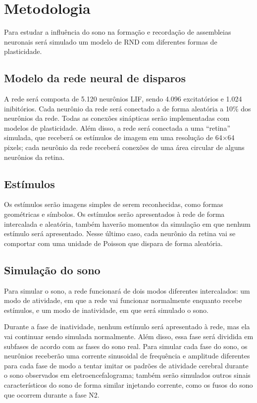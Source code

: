 \chapter{Metodologia}

Para estudar a influência do sono na formação e recordação de assembleias neuronais será simulado um modelo de RND com diferentes
formas de plasticidade.

\section{Modelo da rede neural de disparos}

A rede será composta de 5.120 neurônios LIF, sendo 4.096 excitatórios e 1.024 inibitórios. Cada neurônio da rede será conectado a de
forma aleatória a 10\% dos neurônios da rede. Todas as conexões sinápticas serão implementadas com modelos de plasticidade. Além
disso, a rede será conectada a uma ``retina'' simulada, que receberá os estímulos de imagem em uma resolução de 64$\times$64
pixels; cada neurônio da rede receberá conexões de uma área circular de alguns neurônios da retina.

\section{Estímulos}

Os estímulos serão imagens simples de serem reconhecidas, como formas geométricas e símbolos. Os estímulos serão apresentados à
rede de forma intercalada e aleatória, também haverão momentos da simulação em que nenhum estímulo será apresentado. Nesse último
caso, cada neurônio da retina vai se comportar com uma unidade de Poisson que dispara de forma aleatória.

\section{Simulação do sono}

Para simular o sono, a rede funcionará de dois modos diferentes intercalados: um modo de atividade, em que a rede vai funcionar
normalmente enquanto recebe estímulos, e um modo de inatividade, em que será simulado o sono. 

Durante a fase de inatividade, nenhum estímulo será apresentado à rede, mas ela vai continuar sendo simulada normalmente. Além
disso, essa fase será dividida em subfases de acordo com as fases do sono real. Para simular cada fase do sono, os neurônios
receberão uma corrente sinusoidal de frequência e amplitude diferentes para cada fase de modo a tentar imitar os padrões de
atividade cerebral durante o sono observados em eletroencefalograma; também serão simulados outros sinais característicos do sono
de forma similar injetando corrente, como os fusos do sono que ocorrem durante a fase N2.

